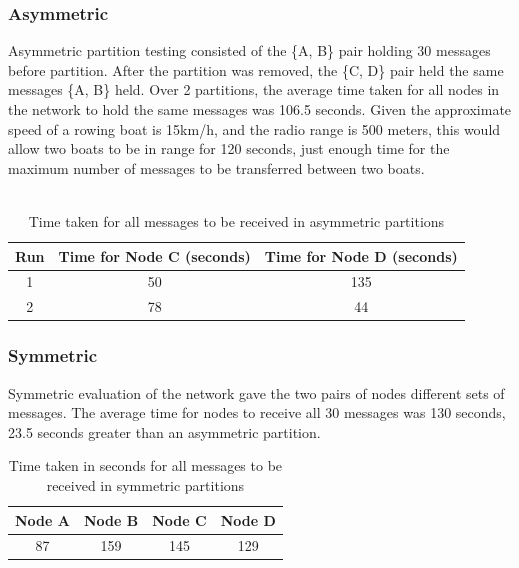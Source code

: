 \documentclass[12pt,a4paper]{report}
\begin{document}
\subsubsection{Asymmetric}
Asymmetric partition testing consisted of the \{A, B\} pair holding 30 messages before partition. After the partition was removed, the \{C, D\} pair held the same messages \{A, B\} held. Over 2 partitions, the average time taken for all nodes in the network to hold the same messages was 106.5 seconds. Given the approximate speed of a rowing boat is 15km/h, and the radio range is 500 meters, this would allow two boats to be in range for 120 seconds, just enough time for the maximum number of messages to be transferred between two boats.  \\ \\
\begin{table}
\begin{center}
\begin{tabular}{ |c|c|c| } 
\hline
Run & Time for Node C (seconds) & Time for Node D (seconds) \\ 
\hline
1 & 50 & 135 \\ 
\hline
2 & 78 & 44  \\ 
\hline
\end{tabular}
\end{center}
\caption{Time taken for all messages to be received in asymmetric partitions}
\end{table}  

\subsubsection{Symmetric}
Symmetric evaluation of the network gave the two pairs of nodes different sets of messages.
The average time for nodes to receive all 30 messages was 130 seconds, 23.5 seconds greater than an asymmetric partition.
\begin{table}
\begin{center}
\begin{tabular}{ |c|c|c|c| } 
\hline
Node A & Node B & Node C & Node D \\ 
\hline
87 & 159 & 145 & 129 \\ 
\hline
\end{tabular}
\end{center}
\caption{Time taken in seconds for all messages to be received in symmetric partitions}
\end{table}  

\end{document}
